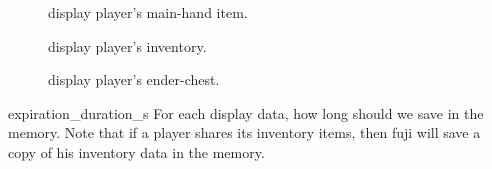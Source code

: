 
\begin{description}
    \item [] display player's main-hand item.
    \item[] display player's inventory.
    \item[] display player's ender-chest.
\end{description}

\begin{Configuration}
    \item[expiration\_duration\_s]{
        For each display data, how long should we save in the memory.
        Note that if a player shares its inventory items, then fuji will save a copy of his inventory data in the memory.
    }

\end{Configuration}